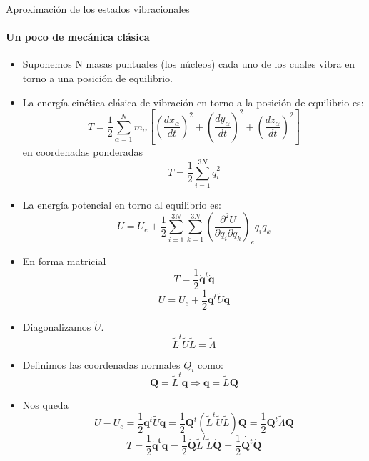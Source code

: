 \documentclass[a4paper]{beamer}
\begin{document}
\begin{frame}{Aproximación de los estados vibracionales}
\framesubtitle{Un poco de mecánica clásica}
\begin{itemize}
\item Suponemos N masas puntuales (los núcleos) cada uno de los cuales vibra en torno a una posición de equilibrio.
\item La energía cinética clásica de vibración en torno a la posición de equilibrio es:
\begin{equation}
T= \frac{1}{2}\sum_{\alpha = 1}^Nm_\alpha\left[\left(\frac{dx_\alpha}{dt}\right)^2+\left(\frac{dy_\alpha}{dt}\right)^2+\left(\frac{dz_\alpha}{dt}\right)^2\right]
\end{equation}
en coordenadas ponderadas
\begin{equation}
T=\frac{1}{2}\sum_{i=1}^{3N}\dot q_i^2
\end{equation}
\item La energía potencial en torno al equilibrio es:
\begin{equation}
U = U_e + \frac{1}{2}\sum_{i=1}^{3N}\sum_{k=1}^{3N}\left(\frac{\partial^2U}{\partial q_i \partial q_k}\right)_eq_iq_k
\end{equation}
\end{itemize}
\end{frame}

\begin{frame}
\begin{itemize}
\item En forma matricial
\begin{equation}
T=\frac{1}{2}\boldsymbol {\dot q}^t\boldsymbol {\dot q}
\end{equation}
\begin{equation}
U=U_e+\frac{1}{2}\boldsymbol q^t\tilde U\boldsymbol q
\end{equation}
\item Diagonalizamos $\tilde U$.
\begin{equation}
\tilde L^t\tilde U\tilde L = \tilde \Lambda
\end{equation}
\item Definimos las coordenadas normales $Q_i$ como:
\begin{equation}
\boldsymbol Q = \tilde L^t\boldsymbol q \Rightarrow \boldsymbol q = \tilde L\boldsymbol Q
\end{equation}
\item Nos queda
\begin{equation}
U-U_e=\frac{1}{2}\boldsymbol q^t\tilde U \boldsymbol q = \frac{1}{2}\boldsymbol Q^t (\tilde L^t\tilde U \tilde L) \boldsymbol Q =  \frac{1}{2}\boldsymbol Q^t\tilde \Lambda \boldsymbol Q
\end{equation}
\begin{equation}
T=\frac{1}{2}\boldsymbol{\dot q^t \dot q}=\frac{1}{2}\boldsymbol{\dot Q}\tilde L^t\tilde L\boldsymbol{\dot Q}= \frac{1}{2}\dot{\boldsymbol Q^t}\dot{\boldsymbol Q}
\end{equation}
\end{itemize}
\end{frame}
\end{document}
